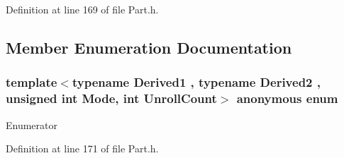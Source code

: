 Definition at line 169 of file Part.\-h.



\subsection{Member Enumeration Documentation}
\hypertarget{structei__part__assignment__impl_ae540caa55a1704d14df9aba20d8ebb92}{\subsubsection[{anonymous enum}]{\setlength{\rightskip}{0pt plus 5cm}template$<$typename Derived1 , typename Derived2 , unsigned int Mode, int Unroll\-Count$>$ anonymous enum}}\label{structei__part__assignment__impl_ae540caa55a1704d14df9aba20d8ebb92}
\begin{Desc}
\item[Enumerator]\par
\begin{description}
\item[{\em 
\hypertarget{structei__part__assignment__impl_ae540caa55a1704d14df9aba20d8ebb92a970f4d33a7b9468a8b74fd313b8b9016}{col}\label{structei__part__assignment__impl_ae540caa55a1704d14df9aba20d8ebb92a970f4d33a7b9468a8b74fd313b8b9016}
}]\item[{\em 
\hypertarget{structei__part__assignment__impl_ae540caa55a1704d14df9aba20d8ebb92a0c2d5c68267ae914f863ab3c612b4b70}{row}\label{structei__part__assignment__impl_ae540caa55a1704d14df9aba20d8ebb92a0c2d5c68267ae914f863ab3c612b4b70}
}]\end{description}
\end{Desc}


Definition at line 171 of file Part.\-h.



